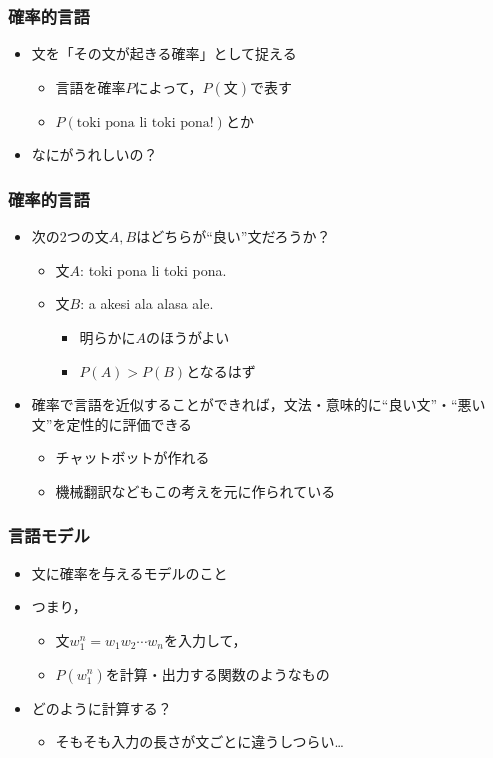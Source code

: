 \documentclass[14pt]{beamer}
\begin{document}
\begin{frame}
	\frametitle{確率的言語}

	\begin{itemize}
		\item 文を「その文が起きる確率」として捉える
			\begin{itemize}
				\item 言語を確率$P$によって，$P(\text{文})$で表す
				\item $P(\text{toki pona li toki pona!})$とか
			\end{itemize}
		\item なにがうれしいの？
	\end{itemize}
\end{frame}

\begin{frame}
	\frametitle{確率的言語}

	\begin{itemize}
		\item 次の2つの文$A, B$はどちらが``良い''文だろうか？
			\begin{itemize}
				\item 文$A$: toki pona li toki pona.
				\item 文$B$: a akesi ala alasa ale.
					\begin{itemize}
						\item 明らかに$A$のほうがよい
						\item $P(A) > P(B)$となるはず
					\end{itemize}
			\end{itemize}
		\item 確率で言語を近似することができれば，文法・意味的に``良い文''・``悪い文''を定性的に評価できる
			\begin{itemize}
				\item チャットボットが作れる
				\item 機械翻訳などもこの考えを元に作られている
			\end{itemize}
	\end{itemize}
\end{frame}

\begin{frame}
	\frametitle{言語モデル}

	\begin{itemize}
		\item 文に確率を与えるモデルのこと
		\item つまり，
			\begin{itemize}
				\item 文$w_1^n = w_1 w_2 \cdots w_n$を入力して，
				\item $P(w_1^n)$を計算・出力する関数のようなもの
			\end{itemize}
		\item どのように計算する？
			\begin{itemize}
				\item そもそも入力の長さが文ごとに違うしつらい…
			\end{itemize}
	\end{itemize}
\end{frame}
\end{document}

